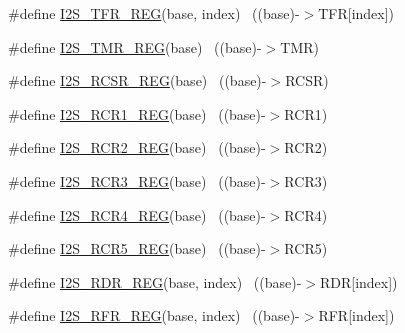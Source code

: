 \begin{DoxyCompactItemize}
\item 
\#define \hyperlink{group___i2_s___register___accessor___macros_ga836a44a99ae9077cdf8909db381b6b68}{I2\+S\+\_\+\+T\+F\+R\+\_\+\+R\+EG}(base,  index)                                ~((base)-\/$>$T\+FR\mbox{[}index\mbox{]})
\item 
\#define \hyperlink{group___i2_s___register___accessor___macros_ga1ca2b4f31362bf93e985588595f2dbd1}{I2\+S\+\_\+\+T\+M\+R\+\_\+\+R\+EG}(base)                                            ~((base)-\/$>$T\+MR)
\item 
\#define \hyperlink{group___i2_s___register___accessor___macros_gabb9a8ee9dfb5ae4b28895d4cb285ae16}{I2\+S\+\_\+\+R\+C\+S\+R\+\_\+\+R\+EG}(base)                                          ~((base)-\/$>$R\+C\+SR)
\item 
\#define \hyperlink{group___i2_s___register___accessor___macros_ga48a001dfc8fcd9cc418a17a3d0223baf}{I2\+S\+\_\+\+R\+C\+R1\+\_\+\+R\+EG}(base)                                          ~((base)-\/$>$R\+C\+R1)
\item 
\#define \hyperlink{group___i2_s___register___accessor___macros_ga5d3d61d720b40d692a114a1e98fd274e}{I2\+S\+\_\+\+R\+C\+R2\+\_\+\+R\+EG}(base)                                          ~((base)-\/$>$R\+C\+R2)
\item 
\#define \hyperlink{group___i2_s___register___accessor___macros_gad37ff97af99ab3c5fd2e44ab0eccb259}{I2\+S\+\_\+\+R\+C\+R3\+\_\+\+R\+EG}(base)                                          ~((base)-\/$>$R\+C\+R3)
\item 
\#define \hyperlink{group___i2_s___register___accessor___macros_ga2979fce419e19c97551d0b5e0b0a61d4}{I2\+S\+\_\+\+R\+C\+R4\+\_\+\+R\+EG}(base)                                          ~((base)-\/$>$R\+C\+R4)
\item 
\#define \hyperlink{group___i2_s___register___accessor___macros_ga48e6d5a9cf36845fb8ccbbfe785f07a8}{I2\+S\+\_\+\+R\+C\+R5\+\_\+\+R\+EG}(base)                                          ~((base)-\/$>$R\+C\+R5)
\item 
\#define \hyperlink{group___i2_s___register___accessor___macros_ga18b3e6efd2a957d910429a72b273bea9}{I2\+S\+\_\+\+R\+D\+R\+\_\+\+R\+EG}(base,  index)                                ~((base)-\/$>$R\+DR\mbox{[}index\mbox{]})
\item 
\#define \hyperlink{group___i2_s___register___accessor___macros_ga0c209378f864f66e1f88468118ee87aa}{I2\+S\+\_\+\+R\+F\+R\+\_\+\+R\+EG}(base,  index)                                ~((base)-\/$>$R\+FR\mbox{[}index\mbox{]})
\item 

\end{DoxyCompactItemize}
